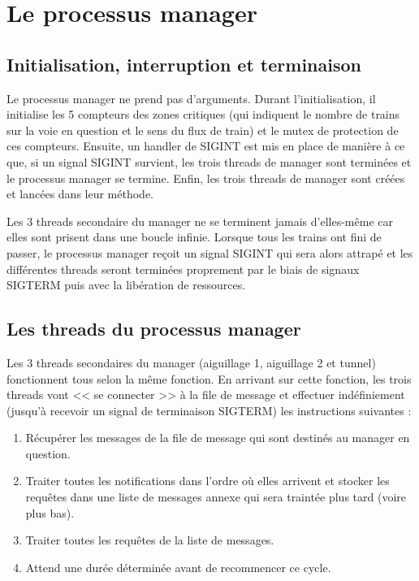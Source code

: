 \documentclass[a4paper,12pt]{article}
\begin{document}
\section{Le processus manager}

\subsection{Initialisation, interruption et terminaison}

Le processus manager ne prend pas d'arguments. Durant l'initialisation, il initialise les 5 compteurs des zones critiques (qui indiquent le nombre de trains sur la voie en question et le sens du flux de train) et le mutex de protection de ces compteurs. Ensuite, un handler de SIGINT est mis en place de manière à ce que, si un signal SIGINT survient, les trois threads de manager sont terminées et le processus manager se termine. Enfin, les trois threads de manager sont créées et lancées dans leur méthode.

Les 3 threads secondaire du manager ne se terminent jamais d'elles-même car elles sont prisent dans une boucle infinie. Lorsque tous les trains ont fini de passer, le processus manager reçoit un signal SIGINT qui sera alors attrapé et les différentes threads seront terminées proprement par le biais de signaux SIGTERM puis avec la libération de ressources.

\subsection{Les threads du processus manager}

Les 3 threads secondaires du manager (aiguillage 1, aiguillage 2 et tunnel) fonctionnent tous selon la même fonction. En arrivant sur cette fonction, les trois threads vont << se connecter >> à la file de message et effectuer indéfiniement (jusqu'à recevoir un signal de terminaison SIGTERM) les instructions suivantes :

\begin{enumerate}
    \item Récupérer les messages de la file de message qui sont destinés au manager en question.
    \item Traiter toutes les notifications dans l'ordre où elles arrivent et stocker les requêtes dans une liste de messages annexe qui sera traintée plus tard (voire plus bas).
    \item Traiter toutes les requêtes de la liste de messages.
    \item Attend une durée déterminée avant de recommencer ce cycle.
\end{enumerate}
\end{document}
